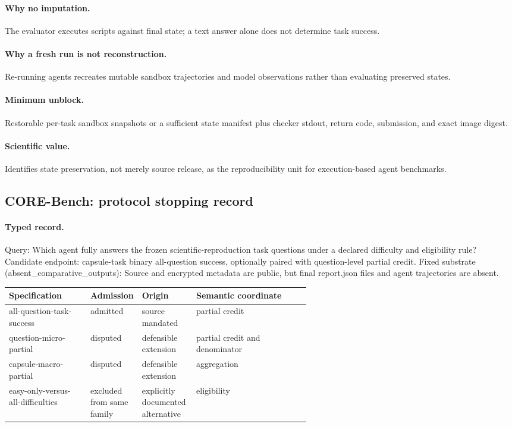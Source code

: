 \paragraph{Why no imputation.} The evaluator executes scripts against final state; a text answer alone does not determine task success.

\paragraph{Why a fresh run is not reconstruction.} Re-running agents recreates mutable sandbox trajectories and model observations rather than evaluating preserved states.

\paragraph{Minimum unblock.} Restorable per-task sandbox snapshots or a sufficient state manifest plus checker stdout, return code, submission, and exact image digest.

\paragraph{Scientific value.} Identifies state preservation, not merely source release, as the reproducibility unit for execution-based agent benchmarks.

\subsection{CORE-Bench: protocol stopping record}\label{app:r8-core-bench}

\paragraph{Typed record.} Query: Which agent fully answers the frozen scientific-reproduction task questions under a declared difficulty and eligibility rule? Candidate endpoint: capsule-task binary all-question success, optionally paired with question-level partial credit. Fixed substrate (absent\_comparative\_outputs): Source and encrypted metadata are public, but final report.json files and agent trajectories are absent.

\begingroup
\scriptsize
\begin{tabularx}{\linewidth}{@{}p{0.27\linewidth}p{0.14\linewidth}p{0.18\linewidth}X@{}}
\toprule
Specification & Admission & Origin & Semantic coordinate \\
\midrule
all-question-task-success & admitted & source mandated & partial credit \\
question-micro-partial & disputed & defensible extension & partial credit and denominator \\
capsule-macro-partial & disputed & defensible extension & aggregation \\
easy-only-versus-all-difficulties & excluded from same family & explicitly documented alternative & eligibility \\
\bottomrule
\end{tabularx}
\endgroup

